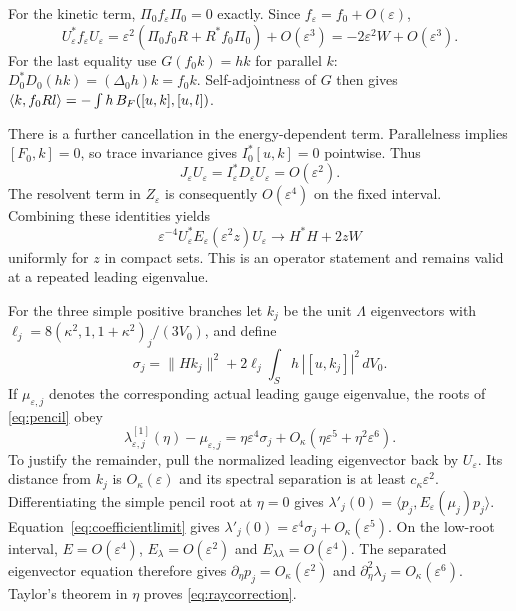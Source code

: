 For the kinetic term, $\Pi_0f_\varepsilon\Pi_0=0$ exactly.
Since $f_\varepsilon=f_0+O(\varepsilon)$,
\[
 U_\varepsilon^*f_\varepsilon U_\varepsilon
 =\varepsilon^2(\Pi_0f_0R+R^*f_0\Pi_0)+O(\varepsilon^3)
 =-2\varepsilon^2W+O(\varepsilon^3).
\]
For the last equality use $G(f_0k)=hk$ for parallel $k$:
$D_0^*D_0(hk)=(\Delta_0h)k=f_0k$. Self-adjointness of $G$
then gives
$\langle k,f_0Rl\rangle=-\int h\,B_F([u,k],[u,l])$.

There is a further cancellation in the energy-dependent term.
Parallelness implies $[F_0,k]=0$, so trace invariance gives
$I_0^*[u,k]=0$ pointwise. Thus
\[
 J_\varepsilon U_\varepsilon
 =I_\varepsilon^*D_\varepsilon U_\varepsilon
 =O(\varepsilon^2).
\]
The resolvent term in $Z_\varepsilon$ is consequently
$O(\varepsilon^4)$ on the fixed interval. Combining these
identities yields
\begin{equation}\label{eq:coefficientlimit}
 \varepsilon^{-4}U_\varepsilon^*
 E_\varepsilon(\varepsilon^2z)U_\varepsilon
 \longrightarrow H^*H+2zW
\end{equation}
uniformly for $z$ in compact sets. This is an operator statement
and remains valid at a repeated leading eigenvalue.

For the three simple positive branches let $k_j$ be the unit
$\Lambda$ eigenvectors with
$\ell_j=8(\kappa^2,1,1+\kappa^2)_j/(3V_0)$, and define
\begin{equation}\label{eq:sigmacoefficient}
 \sigma_j=\|Hk_j\|^2+
       2\ell_j\int_S h\,|[u,k_j]|^2\,dV_0.
\end{equation}
If $\mu_{\varepsilon,j}$ denotes the corresponding actual
leading gauge eigenvalue, the roots of \eqref{eq:pencil} obey
\begin{equation}\label{eq:raycorrection}
 \lambda_{\varepsilon,j}^{[1]}(\eta)-\mu_{\varepsilon,j}
 =\eta\varepsilon^4\sigma_j
 +O_\kappa(\eta\varepsilon^5+\eta^2\varepsilon^6).
\end{equation}
To justify the remainder, pull the normalized leading eigenvector
back by $U_\varepsilon$. Its distance from $k_j$ is
$O_\kappa(\varepsilon)$ and its spectral separation is at least
$c_\kappa\varepsilon^2$. Differentiating the simple pencil root
at $\eta=0$ gives
$\lambda'_j(0)=\langle p_j,E_\varepsilon(\mu_j)p_j\rangle$.
Equation~\eqref{eq:coefficientlimit} gives
$\lambda'_j(0)=\varepsilon^4\sigma_j+O_\kappa(\varepsilon^5)$.
On the low-root interval,
$E=O(\varepsilon^4)$, $E_\lambda=O(\varepsilon^2)$ and
$E_{\lambda\lambda}=O(\varepsilon^4)$. The separated eigenvector
equation therefore gives $\partial_\eta p_j=O_\kappa(\varepsilon^2)$
and $\partial_\eta^2\lambda_j=O_\kappa(\varepsilon^6)$.
Taylor's theorem in $\eta$ proves \eqref{eq:raycorrection}.

